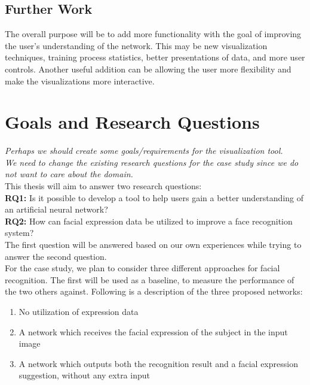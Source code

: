 \subsection{Further Work}

The overall purpose will be to add more functionality with the goal of improving the user's understanding of the network. This may be new visualization techniques, training process statistics, better presentations of data, and more user controls. Another useful addition can be allowing the user more flexibility and make the visualizations more interactive.

\section{Goals and Research Questions}

\textit{Perhaps we should create some goals/requirements for the visualization tool. \\
We need to change the existing research questions for the case study since we do not want to care about the domain.}\\

\noindent This thesis will aim to answer two research questions: \\
\noindent\textbf{RQ1:} Is it possible to develop a tool to help users gain a better understanding of an artificial neural network? \\
\noindent\textbf{RQ2:} How can facial expression data be utilized to improve a face recognition system? \\

\noindent The first question will be answered based on our own experiences while trying to answer the second question. \\

\noindent For the case study, we plan to consider three different approaches for facial recognition. The first will be used as a baseline, to measure the performance of the two others against. Following is a description of the three proposed networks:
\begin{enumerate}
    \item No utilization of expression data
    \item A network which receives the facial expression of the subject in the input image
    \item A network which outputs both the recognition result and a facial expression suggestion, without any extra input
\end{enumerate}

